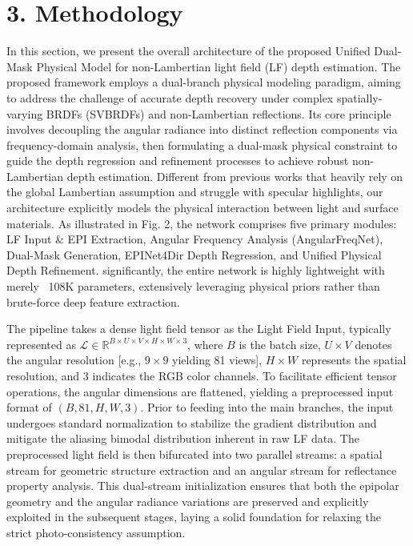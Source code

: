 \section{3. Methodology}

In this section, we present the overall architecture of the proposed Unified Dual-Mask Physical Model for non-Lambertian light field (LF) depth estimation. The proposed framework employs a dual-branch physical modeling paradigm, aiming to address the challenge of accurate depth recovery under complex spatially-varying BRDFs (SVBRDFs) and non-Lambertian reflections. Its core principle involves decoupling the angular radiance into distinct reflection components via frequency-domain analysis, then formulating a dual-mask physical constraint to guide the depth regression and refinement processes to achieve robust non-Lambertian depth estimation. Different from previous works that heavily rely on the global Lambertian assumption and struggle with specular highlights, our architecture explicitly models the physical interaction between light and surface materials. As illustrated in Fig. 2, the network comprises five primary modules: LF Input \& EPI Extraction, Angular Frequency Analysis (AngularFreqNet), Dual-Mask Generation, EPINet4Dir Depth Regression, and Unified Physical Depth Refinement. significantly, the entire network is highly lightweight with merely ~108K parameters, extensively leveraging physical priors rather than brute-force deep feature extraction.

The pipeline takes a dense light field tensor as the Light Field Input, typically represented as $\mathcal{L} \in \mathbb{R}^{B \times U \times V \times H \times W \times 3}$, where $B$ is the batch size, $U \times V$ denotes the angular resolution  [e.g., $9 \times 9$ yielding 81 views], $H \times W$ represents the spatial resolution, and $3$ indicates the RGB color channels. To facilitate efficient tensor operations, the angular dimensions are flattened, yielding a preprocessed input format of $(B, 81, H, W, 3)$. Prior to feeding into the main branches, the input undergoes standard normalization to stabilize the gradient distribution and mitigate the aliasing bimodal distribution inherent in raw LF data. The preprocessed light field is then bifurcated into two parallel streams: a spatial stream for geometric structure extraction and an angular stream for reflectance property analysis. This dual-stream initialization ensures that both the epipolar geometry and the angular radiance variations are preserved and explicitly exploited in the subsequent stages, laying a solid foundation for relaxing the strict photo-consistency assumption.

